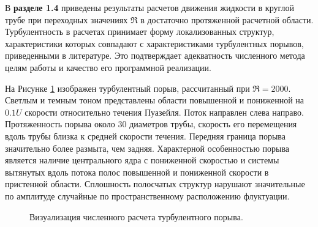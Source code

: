 В \textbf{разделе 1.4} приведены результаты расчетов движения жидкости в круглой трубе при переходных значениях $\Re$ в достаточно протяженной расчетной области. Турбулентность в расчетах принимает форму локализованных структур, характеристики которых совпадают с характеристиками турбулентных порывов, приведенными в литературе. Это подтверждает адекватность численного метода целям работы и качество его программной реализации. 

На Рисунке \ref{puff_3D_img} изображен турбулентный порыв, рассчитанный при $\Re = 2000$. Светлым и темным тоном представлены области повышенной и пониженной на $0.1U$ скорости относительно течения Пуазейля. Поток направлен слева направо. Протяженность порыва около 30 диаметров трубы, скорость его перемещения вдоль трубы близка к средней скорости течения. Передняя граница порыва значительно более размыта, чем задняя. Характерной особенностью порыва является наличие центрального ядра с пониженной скоростью и системы вытянутых вдоль потока полос повышенной и пониженной скорости в пристенной области. Сплошность полосчатых структур нарушают значительные по амплитуде случайные по пространственному расположению флуктуации.

\begin{figure}
\caption{Визуализация численного расчета турбулентного порыва.}
\label{puff_3D_img}
\end{figure}
